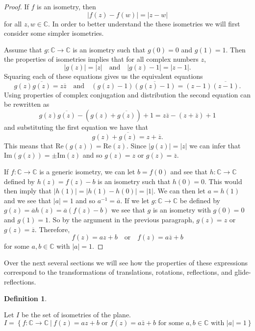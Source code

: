 \documentclass[
]{book}
\theoremstyle{definition}
\newtheorem{definition}{Definition}[chapter]
\theoremstyle{definition}
\theoremstyle{definition}
\theoremstyle{definition}
\theoremstyle{remark}
\begin{document}
\begin{proof}

If \(f\) is an isometry, then
\[|f(z)-f(w)|=|z-w|\] for all \(z,w\in \mathbb{C}\).
In order to better understand the these isometries we will first consider some simpler isometries.

Assume that \(g:\mathbb{C}\rightarrow \mathbb{C}\) is an isometry such that \(g(0)=0\) and \(g(1)=1\). Then the properties of isometries implies that for all complex numbers \(z\),
\[|g(z)|=|z| \quad \mbox{and} \quad |g(z)-1|=|z-1|.\] Squaring each of these equations gives us the equivalent equations
\[g(z) \overline{g(z)} = z \overline{z} \quad \mbox{and} \quad (g(z)-1)\overline{(g(z)-1)} = (z-1)\overline{(z-1)}.\]
Using properties of complex conjugation and distribution the second equation can be rewritten as
\[g(z)\overline{g(z)} - (g(z)+\overline{g(z)}) +1 = z\overline{z} - (z+\overline{z}) +1\] and substituting the first equation we have that
\[g(z)+\overline{g(z)} = z+\overline{z}.\] This means that \(\mbox{Re}(g(z)) = \mbox{Re}(z)\). Since \(|g(z)|=|z|\) we can infer that \(\mbox{Im}(g(z))= \pm \mbox{Im}(z)\) and so \(g(z)=z\) or \(g(z)=\overline{z}\).

If \(f:\mathbb{C}\rightarrow \mathbb{C}\) is a generic isometry, we can let \(b=f(0)\) and see that \(h:\mathbb{C}\rightarrow\mathbb{C}\) defined by \(h(z)=f(z)-b\) is an isometry such that \(h(0)=0\). This would then imply that \(|h(1)| = |h(1)-h(0)|=|1|\). We can then let \(a=h(1)\) and we see that \(|a|=1\) and so \(a^{-1}=\overline{a}\). If we let \(g:\mathbb{C}\rightarrow \mathbb{C}\) be defined by \(g(z)=\overline{a} h(z) = \overline{a} (f(z)-b)\) we see that \(g\) is an isometry with \(g(0)=0\) and \(g(1)=1\). So by the argument in the previous paragraph, \(g(z)=z\) or \(g(z)=\overline{z}\). Therefore,
\[f(z)= az+b \quad \mbox{or} \quad f(z)=a \overline{z} +b\] for some \(a,b\in \mathbb{C}\) with \(|a|=1\).

\end{proof}

Over the next several sections we will see how the properties of these expressions correspond to the transformations of translations, rotations, reflections, and glide-reflections.

\begin{definition}
\protect\hypertarget{def:unlabeled-div-256}{}\label{def:unlabeled-div-256}

Let \(I\) be the set of isometries of the plane.
\[I = \left\{ f: \mathbb{C} \rightarrow \mathbb{C} \:\vert \: f(z)=a z+b \mbox{ or } f(z)=a \bar{z}+b \mbox{ for some } a, b \in \mathbb{C} \mbox{ with } |a|=1 \right\}\]

\end{definition}
\end{document}
